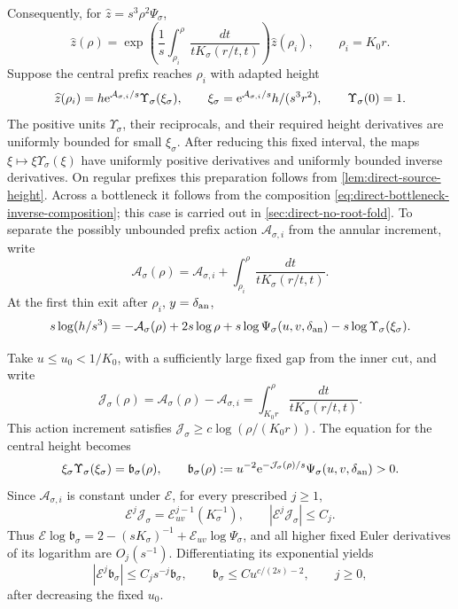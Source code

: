 Consequently, for \(\widehat z=s^3\rho^2\Psi_\sigma\),
\begin{equation}
\label{eq:direct-annulus-action}
 \widehat z(\rho)=
 \exp\left(\frac1s\int_{\rho_i}^{\rho}
                   \frac{dt}{tK_\sigma(r/t,t)}\right)
 \widehat z(\rho_i),\qquad \rho_i=K_0r.
\end{equation}
Suppose the central prefix reaches \(\rho_i\) with adapted height
\begin{equation}
\label{eq:direct-annulus-prefix}
 \widehat z(\rho_i)
       =h \mathrm e^{\mathcal A_{\sigma,i}/s}\Upsilon_\sigma(\xi_\sigma),
 \qquad
 \xi_\sigma=\mathrm e^{\mathcal A_{\sigma,i}/s}
                    h/(s^3r^2),\qquad \Upsilon_\sigma(0)=1.
\end{equation}
The positive units \(\Upsilon_\sigma\), their reciprocals, and their required height
derivatives are uniformly bounded for small \(\xi_\sigma\).
After reducing this fixed interval, the maps
\(\xi\mapsto\xi\Upsilon_\sigma(\xi)\) have uniformly positive
derivatives and uniformly bounded inverse derivatives.
On regular prefixes this preparation follows from
\cref{lem:direct-source-height}. Across a bottleneck it follows from the
composition \eqref{eq:direct-bottleneck-inverse-composition}; this case
is carried out in \cref{sec:direct-no-root-fold}. To separate the possibly
unbounded prefix action \(\mathcal A_{\sigma,i}\) from the annular
increment, write
\[
 \mathcal A_\sigma(\rho)=\mathcal A_{\sigma,i}
                +\int_{\rho_i}^{\rho}
                      \frac{dt}{tK_\sigma(r/t,t)} .
\]
At the first thin exit after \(\rho_i\), \(y=\delta_{\rm an}\),
\begin{equation}
\label{eq:direct-annulus-source}
 s\log(h/s^3)=-\mathcal A_\sigma(\rho)+2s\log\rho
       +s\log\Psi_\sigma(u,v,\delta_{\rm an})
       -s\log\Upsilon_\sigma(\xi_\sigma).
\end{equation}

Take \(u\le u_0<1/K_0\), with a sufficiently large fixed
gap from the inner cut, and write
\[
 \mathcal J_\sigma(\rho)=\mathcal A_\sigma(\rho)-\mathcal A_{\sigma,i}
       =\int_{K_0r}^{\rho}\frac{dt}{tK_\sigma(r/t,t)}.
\]
This action increment satisfies $\mathcal J_\sigma\ge c\log(\rho/(K_0r))$.
The equation for the central height becomes
\[
 \xi_\sigma\Upsilon_\sigma(\xi_\sigma)=\mathfrak b_\sigma(\rho),\qquad
 \mathfrak b_\sigma(\rho)
       :=u^{-2}\mathrm e^{-\mathcal J_\sigma(\rho)/s}\Psi_\sigma(u,v,\delta_{\rm an})>0.
\]
Since $\mathcal A_{\sigma,i}$ is constant under $\mathcal E$,
for every prescribed $j\ge1$,
\[
 \mathcal E^j\mathcal J_\sigma
       =\mathcal E_{uv}^{j-1}(K_\sigma^{-1}),\qquad
 |\mathcal E^j\mathcal J_\sigma|\le C_j.
\]
Thus $\mathcal E\log\mathfrak b_\sigma
 =2-(sK_\sigma)^{-1}+\mathcal E_{uv}\log\Psi_\sigma$,
and all higher fixed Euler derivatives of its logarithm are $O_j(s^{-1})$.
Differentiating its exponential yields
\begin{equation}
\label{eq:direct-annulus-input-jets}
 |\mathcal E^j\mathfrak b_\sigma|
       \le C_js^{-j}\mathfrak b_\sigma,\qquad
 \mathfrak b_\sigma\le Cu^{c/(2s)-2},\qquad j\ge0,
\end{equation}
after decreasing the fixed $u_0$.

